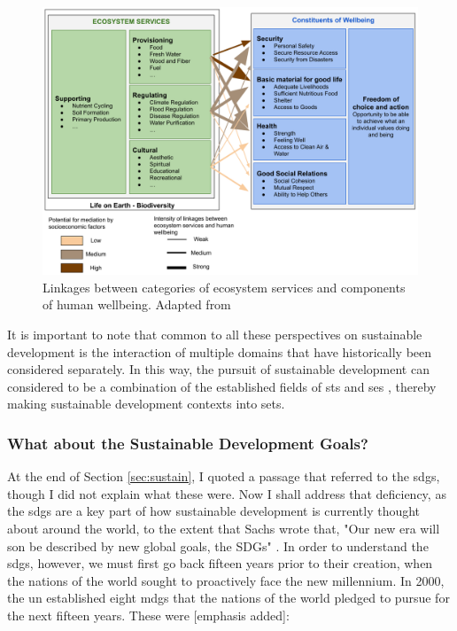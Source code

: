 \begin{figure}[!htb]
	\centering
	\includegraphics[scale=0.35]{Figures/chap2/services_wellbeing.png}
	\caption[Ecosystem Services \& Human Wellbeing]{Linkages between categories of ecosystem services and components of human wellbeing. Adapted from \cite{reidEcosystemsHumanWellbeing2005}}
	\label{fig:services_wellbeing}
\end{figure}

It is important to note that common to all these perspectives on sustainable development is the interaction of multiple domains that have historically been considered separately. In this way, the pursuit of sustainable development can considered to be a combination of the established fields of \acf{sts} \cite{rouseUnderstandingChangeComplex2012,siddiqiSociotechnicalSystemsSustainability2017,sussmanTeachingComplexSociotechnical2010} and \acf{ses} \cite{elsawahEightGrandChallenges2020}, thereby making sustainable development contexts into \acf{sets}.

\subsubsection{What about the Sustainable Development Goals?}

At the end of Section \ref{sec:sustain}, I quoted a passage that referred to the \acp{sdg}, though I did not explain what these were. Now I shall address that deficiency, as the \acp{sdg} are a key part of how sustainable development is currently thought about around the world, to the extent that Sachs wrote that, "Our new era will son be described by new global goals, the SDGs" \cite{sachsAgeSustainableDevelopment2015}. In order to understand the \acp{sdg}, however, we must first go back fifteen years prior to their creation, when the nations of the world sought to proactively face the new millennium. In 2000, the \ac{un} established eight \acp{mdg} that the nations of the world pledged to pursue for the next fifteen years. These were [emphasis added]:

